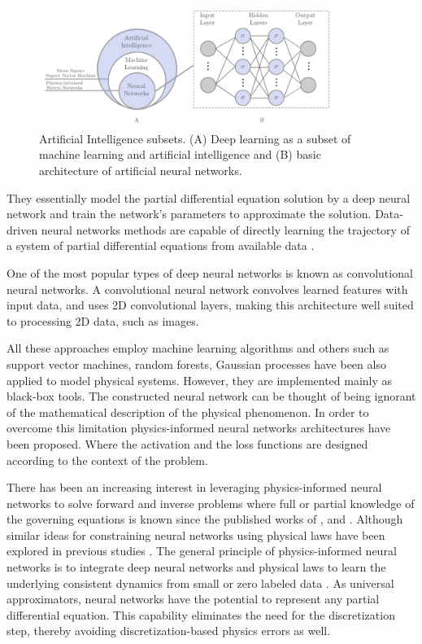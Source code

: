 \documentclass[11pt,twoside]{article}
\begin{document}
\begin{figure}[h]
\centering
    \includegraphics[width=1.0\textwidth]{figs/artificial_intelligence_subsets.pdf}
    \caption{Artificial Intelligence subsets. (A) Deep learning as a subset of machine learning and artificial 
    intelligence and (B) basic architecture of artificial neural networks.}    
    \label{deep_learning_subset_architecture}
\end{figure}

They essentially model the partial differential equation solution by a deep neural network and train the 
network’s parameters to approximate the solution. Data-driven neural networks methods are capable of directly 
learning the trajectory of a system of partial differential equations from available data 
\citep{li_neural_2020,li_fourier_2021}.

One of the most popular types of deep neural networks is known as convolutional neural networks. A 
convolutional neural network convolves learned features with input data, and uses 2D convolutional 
layers, making this architecture well suited to processing 2D data, such as images.

All these approaches employ machine learning algorithms and others such as support vector machines, 
random forests, Gaussian processes have been also applied to model physical systems. However, they 
are implemented mainly as black-box tools. The constructed neural network can be thought of being 
ignorant of the mathematical description of the physical phenomenon. In order to overcome this 
limitation physics-informed neural networks architectures have been proposed. Where the activation 
and the loss functions are designed according to the context of the problem.

There has been an increasing interest in leveraging physics-informed neural networks to solve forward and 
inverse problems where full or partial knowledge of the governing equations is known since the published 
works of ,  and 
. Although similar ideas for constraining neural networks using physical 
laws have been explored in previous studies \citep{lagaris_artificial_1998}. The general principle of 
physics-informed neural networks is to integrate deep neural networks and physical laws to learn the 
underlying consistent dynamics from small or zero labeled data \citep{karniadakis_physics-informed_2021}. 
As universal approximators, neural networks have the potential to represent any partial differential 
equation. This capability eliminates the need for the discretization step, thereby avoiding 
discretization-based physics errors as well. 
\end{document}
